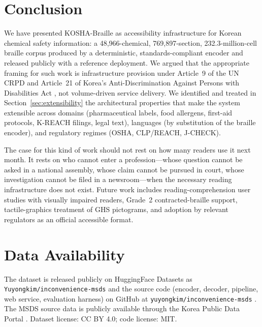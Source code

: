\documentclass[journal]{IEEEtran}
\begin{document}
\section{Conclusion}
\label{sec:conclusion}

We have presented KOSHA-Braille as accessibility infrastructure for Korean chemical safety information: a 48,966-chemical, 769,897-section, 232.3-million-cell braille corpus produced by a deterministic, standards-compliant encoder and released publicly with a reference deployment. We argued that the appropriate framing for such work is infrastructure provision under Article~9 of the UN CRPD \cite{crpd} and Article~21 of Korea's Anti-Discrimination Against Persons with Disabilities Act \cite{kdpa}, not volume-driven service delivery. We identified and treated in Section~\ref{sec:extensibility} the architectural properties that make the system extensible across domains (pharmaceutical labels, food allergens, first-aid protocols, K-REACH filings, legal text), languages (by substitution of the braille encoder), and regulatory regimes (OSHA, CLP/REACH, J-CHECK).

The case for this kind of work should not rest on how many readers use it next month. It rests on who cannot enter a profession---whose question cannot be asked in a national assembly, whose claim cannot be pursued in court, whose investigation cannot be filed in a newsroom---when the necessary reading infrastructure does not exist. Future work includes reading-comprehension user studies with visually impaired readers, Grade~2 contracted-braille support, tactile-graphics treatment of GHS pictograms, and adoption by relevant regulators as an official accessible format.

\section*{Data Availability}

The dataset is released publicly on HuggingFace Datasets as \texttt{Yuyongkim/inconvenience-msds} \cite{hf_dataset} and the source code (encoder, decoder, pipeline, web service, evaluation harness) on GitHub at \texttt{yuyongkim/inconvenience-msds} \cite{github_repo}. The MSDS source data is publicly available through the Korea Public Data Portal \cite{data_go_kr}. Dataset license: CC BY 4.0; code license: MIT.
\end{document}
